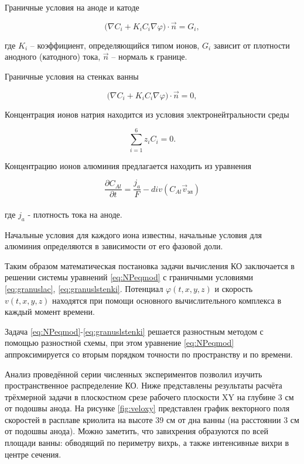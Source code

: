 \documentclass[]{pmi}
\def\phi{\varphi}
\begin{document}
Граничные условия на аноде и катоде

\begin{equation}\label{eq:granuslac}
\big(\nabla C_i + K_i C_i \nabla \phi \big) \cdot \overrightarrow{n} = G_i, 
\end{equation}

где $K_i$ – коэффициент, определяющийся типом ионов,  $G_i$ зависит от плотности анодного (катодного) тока, $\overrightarrow{n}$ – нормаль к границе.

Граничные условия на стенках ванны

\begin{equation}\label{eq:granuslstenki}
\big(\nabla C_i + K_i C_i \nabla \phi \big) \cdot \overrightarrow{n} = 0,
\end{equation}

Концентрация ионов натрия находится из условия электронейтральности среды

\[ \sum\limits_{i=1}^6 z_iC_i = 0. \]

Концентрацию ионов алюминия предлагается находить из уравнения 

\[ \frac{\partial C_{Al}}{\partial t} = \frac{j_a}{F} - div(C_{Al} \overrightarrow{v}_{\text{эл}}) \]
\\
где $j_a$ - плотность тока на аноде.

Начальные условия для каждого иона известны, начальные условия для алюминия определяются в зависимости от его фазовой доли. 

Таким образом математическая постановка задачи вычисления КО заключается в решении системы уравнений \ref{eq:NPeqmod} с граничными условиями \ref{eq:granuslac}, \ref{eq:granuslstenki}. Потенциал $\phi(t,x,y,z)$ и скорость $v(t,x,y,z)$ находятся при помощи основного вычислительного комплекса в каждый момент времени.

Задача \ref{eq:NPeqmod}-\ref{eq:granuslstenki} решается разностным методом с помощью разностной схемы, при этом уравнение \ref{eq:NPeqmod} аппроксимируется со вторым порядком точности по пространству и по времени.

Анализ проведённой серии численных экспериментов позволил изучить пространственное распределение КО. 
Ниже представлены результаты расчёта трёхмерной задачи в плоскостном срезе рабочего плоскости XY на глубине 3 см от подошвы анода. На рисунке \ref{fig:veloxy} представлен график векторного поля скоростей в расплаве криолита на высоте 39 см от дна ванны (на расстоянии 3 см от подошвы анода). Можно заметить, что завихрения образуются по всей площади ванны: обводящий по периметру вихрь, а также интенсивные вихри в центре сечения.
\end{document}

